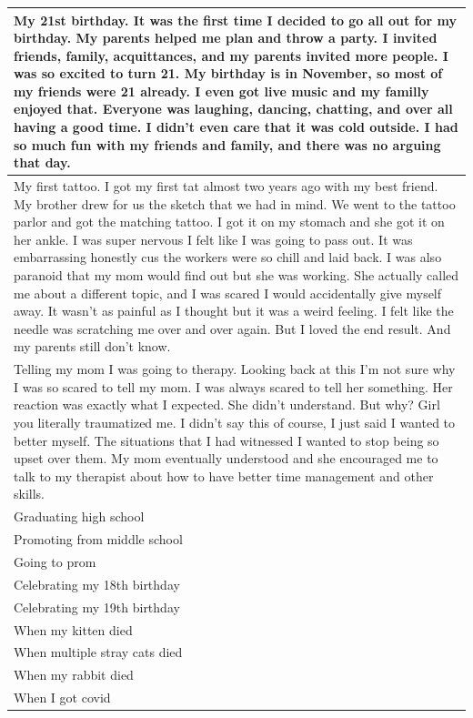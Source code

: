 \documentclass[
  .7em,
  letterpaper,
  DIV=11,
  numbers=noendperiod]{scrartcl}
\begin{document}
\begin{table}
\begin{tabular}{l}
\hline
My 21st birthday. It was the first time I decided to go all out for my birthday. My parents helped me plan and throw a party. I invited friends, family, acquittances, and my parents invited more people. I was so excited to turn 21. My birthday is in November, so most of my friends were 21 already. I even got live music and my familly enjoyed that. Everyone was laughing, dancing, chatting, and over all having a good time. I didn't even care that it was cold outside. I had so much fun with my friends and family, and there was no arguing that day.\\
\hline
My first tattoo. I got my first tat almost two years ago with my best friend. My brother drew for us the sketch that we had in mind. We went to the tattoo parlor and got the matching tattoo. I got it on my stomach and she got it on her ankle. I was super nervous I felt like I was going to pass out. It was embarrassing honestly cus the workers were so chill and laid back. I was also paranoid that my mom would find out but she was working. She actually called me about a different topic, and I was scared I would accidentally give myself away. It wasn’t as painful as I thought but it was a weird feeling. I felt like the needle was scratching me over and over again. But I loved the end result. And my parents still don’t know.\\
\hline
Telling my mom I was going to therapy. Looking back at this I’m not sure why I was so scared to tell my mom. I was always scared to tell her something. Her reaction was exactly what I expected. She didn’t understand. But why? Girl you literally traumatized me. I didn’t say this of course, I just said I wanted to better myself. The situations that I had witnessed I wanted to stop being so upset over them. My mom eventually understood and she encouraged me to talk to my therapist about how to have better time management and other skills.\\
\hline
Graduating high school\\
\hline
Promoting from middle school\\
\hline
Going to prom\\
\hline
Celebrating my 18th birthday\\
\hline
Celebrating my 19th birthday\\
\hline
When my kitten died\\
\hline
When multiple stray cats died\\
\hline
When my rabbit died\\
\hline
When I got covid\\

\end{tabular}
\end{table}
\end{document}
